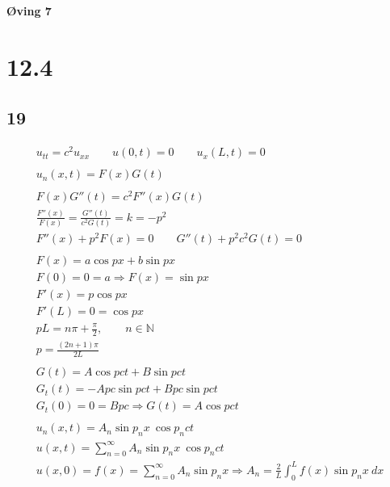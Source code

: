 \begin{center}
	\LARGE{\textbf{Øving 7}}
\end{center}



	


\section*{12.4}

\subsection*{19}


\begin{gather*}
	u_{tt} = c^2 u_{xx}
	\qquad
	u(0, t) = 0
	\qquad
	u_x(L, t) = 0
	\\
	\\
	u_n(x, t) = F(x) G(t)
	\\
	\\
	F(x) G''(t) = c^2 F''(x) G(t)
	\\
	\frac{F''(x)}{F(x)} =
	\frac{G''(t)}{c^2 G(t)} = k = -p^2
	\\
	F''(x) + p^2 F(x) = 0
	\qquad
	G''(t) + p^2 c^2 G(t) = 0
	\\
	\\
	F(x) = a \cos{p x} + b \sin{p x}
	\\
	F(0) = 0 = a \Rightarrow F(x) = \sin{p x}
	\\
	F'(x) = p \cos{p x}
	\\
	F'(L) = 0 = \cos{p x}
	\\
	p L = n \pi + \frac{\pi}{2},
	\qquad
	n \in \mathbb{N}
	\\
	p = \frac{(2 n + 1) \pi}{2 L}
	\\
	\\
	G(t) = A \cos{p c t} + B \sin{p c t}
	\\
	G_t(t) = -A p c \sin{p c t} + B p c \sin{p c t}
	\\
	G_t(0) = 0 = B p c \Rightarrow G(t) = A \cos{p c t}
	\\
	\\
	u_n(x, t) = A_n \sin{p_n x}\ \cos{p_n c t}
	\\
	u(x, t) = \sum_{n = 0}^\infty{A_n \sin{p_n x}\ \cos{p_n c t}}
	\\
	u(x, 0) = f(x) = \sum_{n = 0}^\infty{A_n \sin{p_n x}} \Rightarrow A_n = \frac{2}{L} \int_0^L{f(x) \sin{p_n x}\ dx}
\end{gather*}


